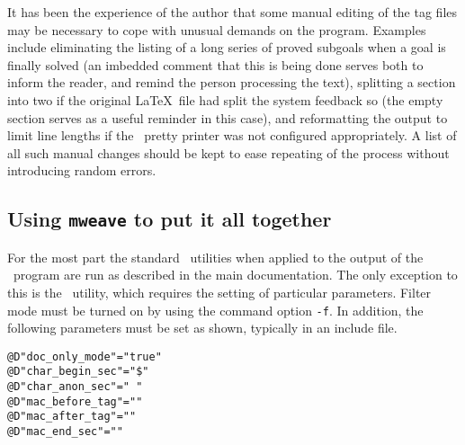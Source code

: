 It has been the experience of the author that some manual editing of
the tag files may be necessary to cope with unusual demands on the
program.  Examples include eliminating the listing of a long series of
proved subgoals when a goal is finally solved (an imbedded comment
that this is being done serves both to inform the reader, and remind
the person processing the text), splitting a section
into two if the original \LaTeX\ file had split the system feedback
so (the empty section serves as a useful reminder in this case), and
reformatting the output to limit line lengths if the \HOL\ pretty
printer was not configured appropriately.  A list of all such manual
changes should be kept to ease repeating of the process without introducing
random errors.


\subsection{Using {\tt mweave} to put it all together}

For the most part the standard \mweb\ utilities when applied to the
output of the \winnow\ program are run as described in the main
documentation.  The only exception to this is the \weave\ utility,
which requires the setting of particular parameters.  Filter mode must
be turned on by using the command option \verb+-f+.  In addition, the
following parameters must be set as shown, typically in an include file.

\begin{verbatim}
@D"doc_only_mode"="true"
@D"char_begin_sec"="$"
@D"char_anon_sec"=" "
@D"mac_before_tag"=""
@D"mac_after_tag"=""
@D"mac_end_sec"=""
\end{verbatim}

%
